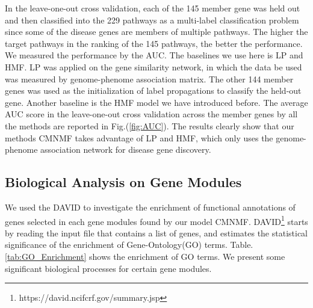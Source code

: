 \documentclass{bmcart}
\begin{document}
 In the leave-one-out cross validation, each of the 145 member gene was held out and then classified into the 229 pathways as a multi-label classification problem since some of the disease genes are
members of multiple pathways. The higher the target pathways in the ranking of the 145 pathways, the better the performance. We measured the performance by the AUC. The baselines we use here is LP and HMF. LP was applied on the gene similarity network, in which the data be used was measured by genome-phenome association matrix. The other 144 member genes was used as the initialization of label propagations to classify the held-out gene. Another baseline is the HMF model we have introduced before. The average AUC score in the leave-one-out cross validation across the  member genes by all the methods are reported in Fig.(\ref{fig:AUC}). The results clearly show that our methods CMNMF takes advantage of LP and HMF, which only uses the genome-phenome association network for disease gene discovery.

\subsection*{\textbf{Biological Analysis on Gene Modules}}%

We used the DAVID\cite{Dennis2003} to investigate the enrichment of functional annotations of genes selected in each gene modules found by our model CMNMF. DAVID\footnote{https://david.ncifcrf.gov/summary.jsp} starts by reading the input file that contains a list of genes, and estimates the statistical significance of the enrichment of Gene-Ontology(GO) terms.
Table.\ref{tab:GO_Enrichment} shows the enrichment of GO terms. We present some significant biological processes for certain  gene modules.
\end{document}
